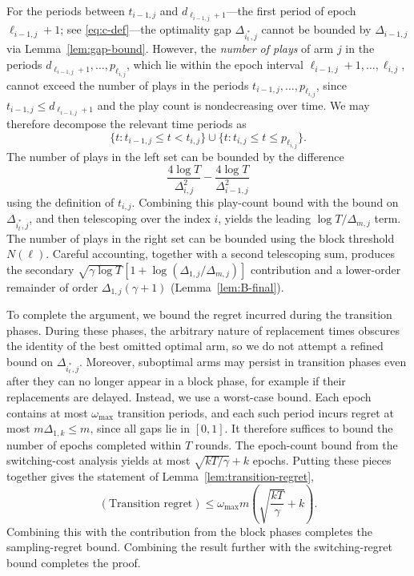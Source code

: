\documentclass[opre,blindrev]{informs3}
\begin{document}
\begin{APPENDICES}
For the periods between \(t_{i-1,j}\) and \(d_{\ell_{i-1,j}+1}\)---the first period of epoch \(\ell_{i-1,j}+1\); see \eqref{eq:c-def}---the optimality gap \(\Delta_{i_t^*,j}\) cannot be bounded by \(\Delta_{i-1,j}\) via Lemma~\ref{lem:gap-bound}. However, the \emph{number of plays} of arm \(j\) in the periods \(d_{\ell_{i-1,j}+1},\dots, p_{\ell_{i,j}}\), which lie within the epoch interval \(\ell_{i-1,j}+1,\dots, \ell_{i,j}\), cannot exceed the number of plays in the periods \(t_{i-1,j},\dots, p_{\ell_{i,j}}\), since \(t_{i-1,j}\leq d_{\ell_{i-1,j}+1}\) and the play count is nondecreasing over time. We may therefore decompose the relevant time periods as
\[
    \{t:t_{i-1,j}\leq t < t_{i,j}\} \cup  \{t:t_{i,j}\leq t \leq p_{\ell_{i,j}}\}.
\]
The number of plays in the left set can be bounded by the difference
\[
    \frac{4\log T}{\Delta_{i,j}^2} - \frac{4\log T}{\Delta_{i-1,j}^2}
\]
using the definition of \(t_{i,j}\). Combining this play-count bound with the bound on \(\Delta_{i_t^*,j}\), and then telescoping over the index \(i\), yields the leading \(\log T/\Delta_{m,j}\) term. The number of plays in the right set can be bounded using the block threshold \(N(\ell)\). Careful accounting, together with a second telescoping sum, produces the secondary \(\sqrt{\gamma\log T}\left[1+\log(\Delta_{1,j}/\Delta_{m,j})\right]\) contribution and a lower-order remainder of order \(\Delta_{1,j}(\gamma+1)\) (Lemma~\ref{lem:B-final}).

To complete the argument, we bound the regret incurred during the transition phases. During these phases, the arbitrary nature of replacement times obscures the identity of the best omitted optimal arm, so we do not attempt a refined bound on \(\Delta_{i_t^*,j}\). Moreover, suboptimal arms may persist in transition phases even after they can no longer appear in a block phase, for example if their replacements are delayed. Instead, we use a worst-case bound. Each epoch contains at most \(\omega_{\max}\) transition periods, and each such period incurs regret at most \(m\Delta_{1,k} \leq m\), since all gaps lie in \([0,1]\). It therefore suffices to bound the number of epochs completed within \(T\) rounds. The epoch-count bound from the switching-cost analysis yields at most \(\sqrt{kT/\gamma}+k\) epochs. Putting these pieces together gives the statement of Lemma~\ref{lem:transition-regret},
\[
    (\text{Transition regret})
    \le
    \omega_{\max} m\!\left(\sqrt{\frac{kT}{\gamma}}+k\right).
\]
Combining this with the contribution from the block phases completes the sampling-regret bound. Combining the result further with the switching-regret bound completes the proof.



\end{APPENDICES}
\end{document}
